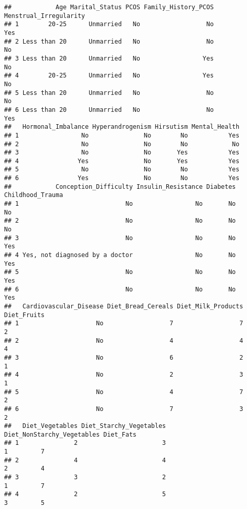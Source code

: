 \documentclass[
]{article}
\begin{document}
\begin{verbatim}
##            Age Marital_Status PCOS Family_History_PCOS Menstrual_Irregularity
## 1        20-25      Unmarried   No                  No                    Yes
## 2 Less than 20      Unmarried   No                  No                     No
## 3 Less than 20      Unmarried   No                 Yes                     No
## 4        20-25      Unmarried   No                 Yes                     No
## 5 Less than 20      Unmarried   No                  No                     No
## 6 Less than 20      Unmarried   No                  No                    Yes
##   Hormonal_Imbalance Hyperandrogenism Hirsutism Mental_Health
## 1                 No               No        No           Yes
## 2                 No               No        No            No
## 3                 No               No       Yes           Yes
## 4                Yes               No       Yes           Yes
## 5                 No               No        No           Yes
## 6                Yes               No        No           Yes
##            Conception_Difficulty Insulin_Resistance Diabetes Childhood_Trauma
## 1                             No                 No       No               No
## 2                             No                 No       No               No
## 3                             No                 No       No              Yes
## 4 Yes, not diagnosed by a doctor                 No       No              Yes
## 5                             No                 No       No              Yes
## 6                             No                 No       No              Yes
##   Cardiovascular_Disease Diet_Bread_Cereals Diet_Milk_Products Diet_Fruits
## 1                     No                  7                  7           2
## 2                     No                  4                  4           4
## 3                     No                  6                  2           1
## 4                     No                  2                  3           1
## 5                     No                  4                  7           2
## 6                     No                  7                  3           2
##   Diet_Vegetables Diet_Starchy_Vegetables Diet_NonStarchy_Vegetables Diet_Fats
## 1               2                       3                          1         7
## 2               4                       4                          2         4
## 3               3                       2                          1         7
## 4               2                       5                          3         5

\end{verbatim}
\end{document}
